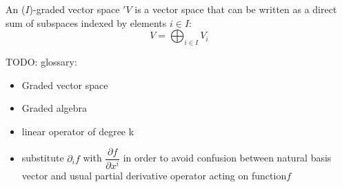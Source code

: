 \documentclass[a4paper,12pt]{scrartcl}
\begin{document}
\begin{landscape}
\begin{minipage}{0.46 \linewidth}
	\end{minipage}
	
	\begin{minipage}{0.46 \linewidth}
\newpage
		An ($I$)-graded vector space $'V$ is a vector space that can be written as a direct sum of subspaces indexed by elements $i\in I$:
		\begin{displaymath}
			V = \bigoplus_{i \in I} V_i
		\end{displaymath}
	\end{minipage}
	\hspace{1cm}
	\begin{minipage}{0.46 \linewidth}
 		TODO: glossary:
 			\begin{itemize}
 				\item Graded vector space
 				\item Graded algebra
 				\item linear operator of degree k
 				\item substitute $\partial_i f $ with $\dfrac{\partial f}{\partial x^i}$ in order to avoid confusion between natural basis vector and usual partial derivative operator acting on function$f$
 			\end{itemize}
	\end{minipage} 
    
  \end{landscape}
\end{document}
